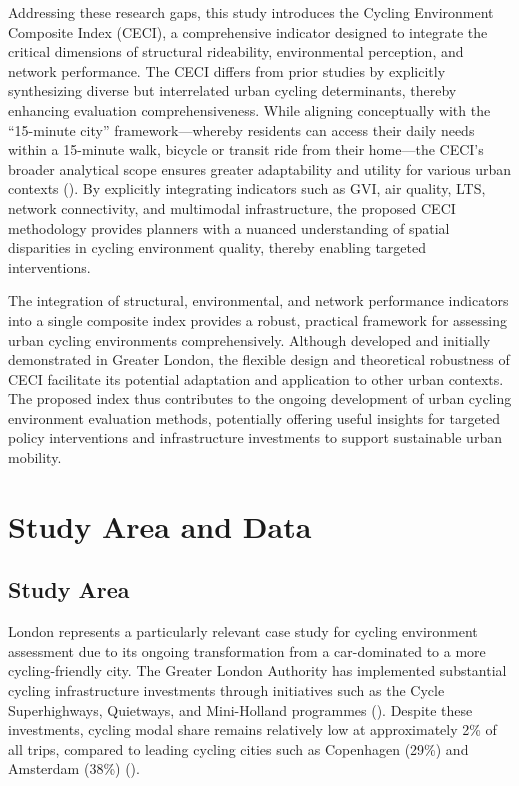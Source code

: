 \documentclass[
  12pt,
  oneside]{book}
\begin{document}
Addressing these research gaps, this study introduces the Cycling Environment Composite Index (CECI), a comprehensive indicator designed to integrate the critical dimensions of structural rideability, environmental perception, and network performance. The CECI differs from prior studies by explicitly synthesizing diverse but interrelated urban cycling determinants, thereby enhancing evaluation comprehensiveness. While aligning conceptually with the ``15-minute city'' framework---whereby residents can access their daily needs within a 15-minute walk, bicycle or transit ride from their home---the CECI's broader analytical scope ensures greater adaptability and utility for various urban contexts (\textcite{moreno_introducing_2021}). By explicitly integrating indicators such as GVI, air quality, LTS, network connectivity, and multimodal infrastructure, the proposed CECI methodology provides planners with a nuanced understanding of spatial disparities in cycling environment quality, thereby enabling targeted interventions.

The integration of structural, environmental, and network performance indicators into a single composite index provides a robust, practical framework for assessing urban cycling environments comprehensively. Although developed and initially demonstrated in Greater London, the flexible design and theoretical robustness of CECI facilitate its potential adaptation and application to other urban contexts. The proposed index thus contributes to the ongoing development of urban cycling environment evaluation methods, potentially offering useful insights for targeted policy interventions and infrastructure investments to support sustainable urban mobility.

\chapter{Study Area and Data}\label{study-area-and-data}

\section{Study Area}\label{study-area}

London represents a particularly relevant case study for cycling environment assessment due to its ongoing transformation from a car-dominated to a more cycling-friendly city. The Greater London Authority has implemented substantial cycling infrastructure investments through initiatives such as the Cycle Superhighways, Quietways, and Mini-Holland programmes (\textcite{tfl_cycling_action_2018}). Despite these investments, cycling modal share remains relatively low at approximately 2\% of all trips, compared to leading cycling cities such as Copenhagen (29\%) and Amsterdam (38\%) (\textcite{aldred_impacts_2019}).
\end{document}
